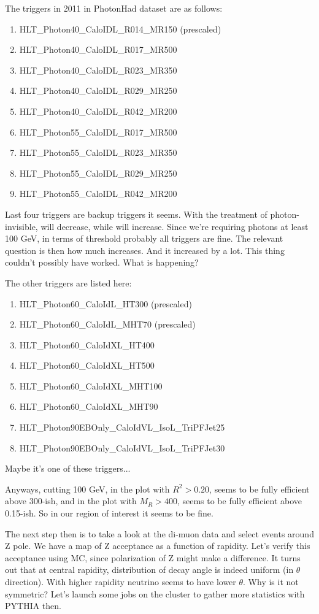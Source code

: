 The triggers in 2011 in PhotonHad dataset are as follows:
\begin{enumerate}
\item HLT\_Photon40\_CaloIDL\_R014\_MR150 (prescaled)
\item HLT\_Photon40\_CaloIDL\_R017\_MR500
\item HLT\_Photon40\_CaloIDL\_R023\_MR350
\item HLT\_Photon40\_CaloIDL\_R029\_MR250
\item HLT\_Photon40\_CaloIDL\_R042\_MR200
\item HLT\_Photon55\_CaloIDL\_R017\_MR500
\item HLT\_Photon55\_CaloIDL\_R023\_MR350
\item HLT\_Photon55\_CaloIDL\_R029\_MR250
\item HLT\_Photon55\_CaloIDL\_R042\_MR200
\end{enumerate}
Last four triggers are backup triggers it seems.  With the treatment of photon-invisible,
\MR will decrease, while \R will increase.  Since we're requiring photons at least 100 GeV,
in terms of \MR threshold probably all triggers are fine.  The relevant question is then how
much \R increases.  And it increased by a lot.  This thing couldn't possibly have worked.
What is happening?

The other triggers are listed here:
\begin{enumerate}
\item HLT\_Photon60\_CaloIdL\_HT300 (prescaled)
\item HLT\_Photon60\_CaloIdL\_MHT70 (prescaled)
\item HLT\_Photon60\_CaloIdXL\_HT400
\item HLT\_Photon60\_CaloIdXL\_HT500
\item HLT\_Photon60\_CaloIdXL\_MHT100
\item HLT\_Photon60\_CaloIdXL\_MHT90
\item HLT\_Photon90EBOnly\_CaloIdVL\_IsoL\_TriPFJet25
\item HLT\_Photon90EBOnly\_CaloIdVL\_IsoL\_TriPFJet30
\end{enumerate}
Maybe it's one of these triggers... \ActionItem

Anyways, cutting 100 GeV, in the plot with $R^2 > 0.20$, \MR seems to be fully efficient above 300-ish, and
in the plot with $M_R > 400$, \RSquare seems to be fully efficient above 0.15-ish.  So in our
region of interest it seems to be fine.

The next step then is to take a look at the di-muon data and select events around Z pole.
We have a map of Z acceptance as a function of rapidity.  Let's verify this acceptance using
MC, since polarization of Z might make a difference.  It turns out that at central rapidity,
distribution of decay angle is indeed uniform (in $\theta$ direction).  With higher rapidity
neutrino seems to have lower $\theta$.  Why is it not symmetric?
Let's launch some jobs on the cluster to gather more statistics with {\sc PYTHIA} then.




